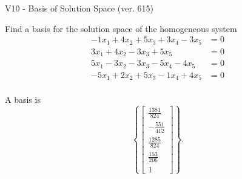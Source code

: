 \begin{exercise}
  \begin{exerciseTitle}V10 - Basis of Solution Space (ver. 615)\end{exerciseTitle}
  \begin{exerciseStatement}
    Find a basis for the solution space of the homogeneous system 
\begin{align*}
 -1 x_ 1 + 4 x_ 2 + 5 x_ 3 + 3 x_ 4 -3 x_ 5 &= 0  \\ 
  3 x_ 1 + 4 x_ 2 -3 x_ 3 + 5 x_ 5 &= 0  \\ 
  5 x_ 1 -3 x_ 2 -3 x_ 3 -5 x_ 4 -4 x_ 5 &= 0  \\ 
  -5 x_ 1 + 2 x_ 2 + 5 x_ 3 -1 x_ 4 + 4 x_ 5 &= 0  \\ 
 \end{align*}


 
  \end{exerciseStatement}

  \begin{exerciseAnswer}
   A basis is   
\[\left\{\left[\begin{array}{c}
\frac{1381}{824} \\
-\frac{551}{412} \\
\frac{1285}{824} \\
\frac{153}{206} \\
1
\end{array}\right]\right\}.\]

  


  \end{exerciseAnswer}
\end{exercise}